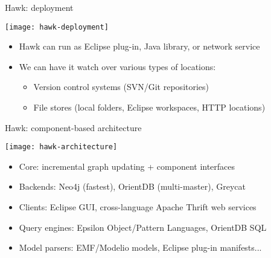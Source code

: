 \begin{frame}{Hawk: deployment}

  \begin{center}
    \texttt{[image: hawk-deployment]}
  \end{center}

  \begin{itemize}
  \item Hawk can run as Eclipse plug-in, Java library, or network service
  \item We can have it watch over various types of locations:
    \begin{itemize}
    \item Version control systems (SVN/Git repositories)
    \item File stores (local folders, Eclipse workspaces, HTTP locations)
    \end{itemize}
  \end{itemize}

\end{frame}

\begin{frame}{Hawk: component-based architecture}
  \begin{center}
    \texttt{[image: hawk-architecture]}
  \end{center}

  \begin{itemize}
  \item Core: incremental graph updating + component interfaces
  \item Backends: Neo4j (fastest), OrientDB (multi-master), Greycat
  \item Clients: Eclipse GUI, cross-language Apache Thrift web services
  \item Query engines: Epsilon Object/Pattern Languages, OrientDB SQL
  \item Model parsers: EMF/Modelio models, Eclipse plug-in manifests...
  \end{itemize}
\end{frame}

